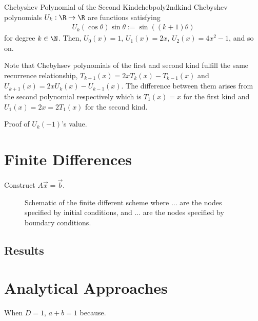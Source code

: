 \documentclass{prettytex/ox/mmsc-special-topic}
\begin{document}
  \begin{definition}{Chebyshev Polynomial of the Second Kind}{chebpoly2ndkind}
    Chebyshev polynomials $U_k: \R \mapsto \R$ are functions satisfying
    \begin{align*}
      U_k(\cos \theta) \sin \theta := \sin\left((k+1) \theta\right)
    \end{align*}
    for degree $k \in \N$. Then, $U_0(x) = 1$, $U_1(x) = 2x$, $U_2(x) = 4x^2-1$, and so on.
  \end{definition}
  Note that Chebyhsev polynomials of the first and second kind fulfill the same recurrence relationship, $T_{k+1}(x) = 2x T_k(x) - T_{k-1}(x)$ and $U_{k+1}(x) = 2x U_k(x) - U_{k-1}(x)$. The difference between them arises from the second polynomial respectively which is $T_1(x)=x$ for the first kind and $U_1(x) = 2x = 2 T_1(x)$ for the second kind.

  Proof of $U_k(-1)$'s value.

  \section{Finite Differences}
  Construct $A \vec{x} = \vec{b}$.

  \begin{figure}[H]
    \centering
    \caption{Schematic of the finite different scheme where ... are the nodes specified by initial conditions, and ... are the nodes specified by boundary conditions.}
    \label{fig:fd-scheme}
  \end{figure}

  \subsection{Results}

  \section{Analytical Approaches}
  When $D = 1$, $a + b = 1$ because. %
\end{document}
